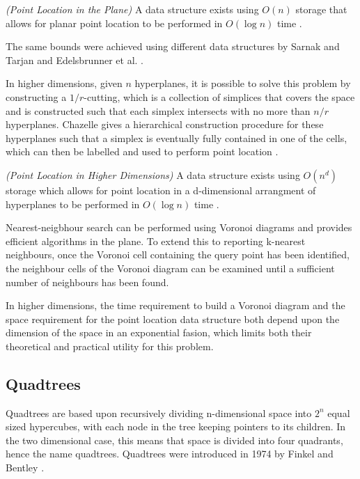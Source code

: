 \documentclass[mcs]{scsthesis}
\begin{document}
\begin{thm} \emph{(Point Location in the Plane)}
A data structure exists using \(O(n)\) storage that allows for planar
point location to be performed in \(O(\log n)\) time \cite{kirkpatrick}.
\end{thm}

The same bounds were achieved using different data structures by Sarnak and
Tarjan \cite{sarnak} and Edelsbrunner et al. \cite{edelsbrunner}.

In higher dimensions, given $n$ hyperplanes, it is possible to solve this problem
by constructing a \(1/r\)-cutting, which is a collection of simplices that
covers the space and is constructed such that each simplex intersects with no
more than \(n/r\) hyperplanes. Chazelle gives a hierarchical construction
procedure for these hyperplanes such that a simplex is eventually fully
contained in one of the cells, which can then be labelled and used to perform
point location \cite{chazelle}.

\begin{thm} \emph{(Point Location in Higher Dimensions)}
A data structure exists using \(O(n^d)\) storage which allows for  
point location in a d-dimensional arrangment of hyperplanes to be performed in
\(O(\log n)\) time \cite{chazelle}.
\end{thm}

Nearest-neigbhour search can be performed using Voronoi diagrams and provides
efficient algorithms in the plane. To extend this to reporting k-nearest
neighbours, once the Voronoi cell containing the query point has been
identified, the neighbour cells of the Voronoi diagram can be examined until
a sufficient number of neighbours has been found. 

In higher dimensions, the time requirement to build a Voronoi diagram and the
space requirement for the point location data structure both depend upon the
dimension of the space in an exponential fasion, which limits both their
theoretical and practical utility for this problem.

\subsection{Quadtrees}

Quadtrees are based upon recursively dividing n-dimensional space into \(2^n\)
equal sized hypercubes, with each node in the tree keeping pointers to its
children.  In the two dimensional case, this means that space is divided into
four quadrants, hence the name quadtrees. Quadtrees were introduced in 1974 by
Finkel and Bentley \cite{quadtree}. 
\end{document}
